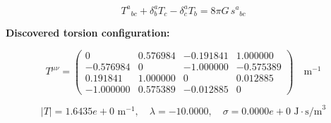 
\begin{equation}
  T^a{}_{bc} + \delta^a_b T_c - \delta^a_c T_b = 8\pi G \, s^a{}_{bc}
\end{equation}

\textbf{Discovered torsion configuration:}

\begin{equation}
  T^{\mu\nu} = \begin{pmatrix}
    0 & 0.576984 & -0.191841 & 1.000000 \\
    -0.576984 & 0 & -1.000000 & -0.575389 \\
    0.191841 & 1.000000 & 0 & 0.012885 \\
    -1.000000 & 0.575389 & -0.012885 & 0
  \end{pmatrix} \quad \text{m}^{-1}
\end{equation}

\begin{equation}
  |T| = 1.6435e+0 \text{ m}^{-1}, \quad
  \lambda = -10.0000, \quad
  \sigma = 0.0000e+0 \text{ J}\cdot\text{s/m}^3
\end{equation}